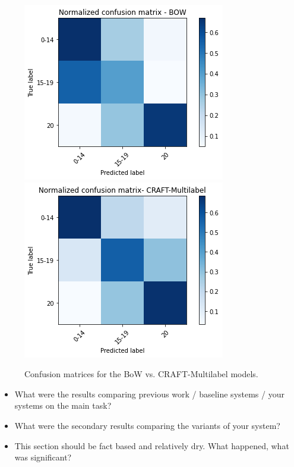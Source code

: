 \documentclass{article}
\begin{document}
\begin{figure}[t]
  \centering
  \includegraphics[width=0.9\columnwidth]{figs/cm-bow.png}
  \includegraphics[width=0.9\columnwidth]{figs/cm-craftmulti.png}
  \caption{Confusion matrices for the BoW vs. CRAFT-Multilabel models.}
  \label{fig:confusion-matrices}
\end{figure}

\begin{itemize}
\item What were the results comparing previous work / baseline systems / your systems on the main task?
\item What were the secondary results comparing the variants of your system?
\item This section should be fact based and relatively dry. What happened, what was significant?
\end{itemize}
\end{document}

